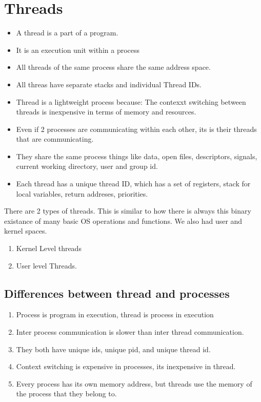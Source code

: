 \documentclass[11pt]{article}
\begin{document}
\section{Threads}
\begin{itemize}
	\item A thread is a part of a program.
	\item It is an execution unit within a process
	\item All threads of the same process share the same address space.
	\item All threas have separate stacks and individual Thread IDs.
	\item Thread is a lightweight process because: The contexxt switching between threads is inexpensive in terms of memory and resources.
	\item Even if 2 processes are communicating within each other, its is their threads that are communicating.
	\item They share the same process things like data, open files, descriptors, signals, current working directory, user and group id. 
	\item Each thread has a unique thread ID, which has a set of registers, stack for local variables, return addreses, priorities. 
\end{itemize}

There are 2 types of threads. This is similar to how there is always this binary existance of many basic OS operations and functions. We also had user and kernel spaces. 
\begin{enumerate}
	\item Kernel Level threads
	\item User level Threads. 
\end{enumerate}

\subsection{Differences between thread and processes}
\begin{enumerate}
	\item Process is program in execution, thread is process in execution
	\item Inter process communication is slower than inter thread communication.
	\item They both have unique ids, unique pid, and unique thread id.
	\item Context switching is expensive in processes, its inexpensive in thread.
	\item Every process has its own memory address, but threads use the memory of the process that they belong to.
\end{enumerate}
\end{document}
